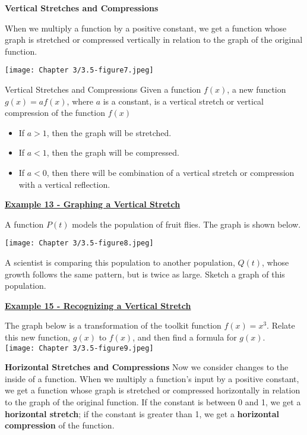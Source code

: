 \documentclass[12pt]{book}
\begin{document}
\textbf{Vertical Stretches and Compressions}

When we multiply a function by a positive constant, we get a function whose graph is stretched or compressed vertically in relation to the graph of the original function.

\centerline{\texttt{[image: Chapter 3/3.5-figure7.jpeg]}}
\vspace{3mm}


\begin{boxR}
    Vertical Stretches and Compressions
    \vspace{1mm}
    \hline
    \vspace{2mm}
    Given a function $f(x)$, a new function $g(x)=a f(x)$, where $a$ is a constant, is a vertical stretch or vertical compression of the function $f(x)$
    \begin{itemize}
        \item If $a > 1$, then the graph will be stretched.
        \item If $a < 1$, then the graph will be compressed.
        \item If $a < 0$, then there will be combination of a vertical stretch or compression with a vertical reflection.
    \end{itemize}
\end{boxR}

\newpage

\underline{\textbf{Example 13 - Graphing a Vertical Stretch}}

A function $P(t)$ models the population of fruit flies. The graph is shown below. 

\centerline{\texttt{[image: Chapter 3/3.5-figure8.jpeg]}}

A scientist is comparing this population to another population, $Q(t)$,
whose growth follows the same pattern, but is twice as large. Sketch a graph of this population.
\vspace{35mm}


\underline{\textbf{Example 15 - Recognizing a Vertical Stretch}}

The graph below is a transformation of the toolkit function $f(x)=x^3$. Relate this new function, $g(x)$ to $f(x)$, and then find a formula for $g(x)$.
\\

\texttt{[image: Chapter 3/3.5-figure9.jpeg]}

\newpage

{\large \textbf{Horizontal Stretches and Compressions}}
Now we consider changes to the inside of a function. When we multiply a function’s input by a positive constant, we get a function whose graph is stretched or compressed horizontally in relation to the graph of the original function. If the constant is between 0 and 1, we get a \textbf{horizontal stretch}; if the constant is greater than 1, we get a \textbf{horizontal compression} of the function.
\\
\end{document}
